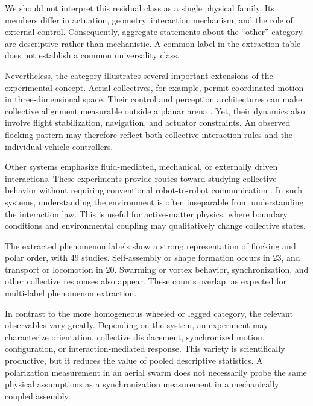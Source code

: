 We should not interpret this residual class
as a single physical family. Its members
differ in actuation, geometry, interaction
mechanism, and the role of external control.
Consequently, aggregate statements about
the ``other'' category are descriptive
rather than mechanistic. A common label
in the extraction table does not establish
a common universality class.

Nevertheless, the category illustrates
several important extensions of the
experimental concept. Aerial collectives,
for example, permit coordinated motion
in three-dimensional space. Their control
and perception architectures can make
collective alignment measurable outside
a planar arena
\cite{Hauert2011reynoldsflockingin,Vsrhelyi2014outdoorflockingand,Schilling2021visionbaseddronef,Horyna2024fastswarmingofuav,Zhang2022agileformationcont,Amorim2024aminimalistic3dse,Iacone2024decentralizedaccele}.
Yet, their dynamics also involve flight
stabilization, navigation, and actuator
constraints. An observed flocking pattern
may therefore reflect both collective
interaction rules and the individual
vehicle controllers.

Other systems emphasize fluid-mediated,
mechanical, or externally driven
interactions. These experiments provide
routes toward studying collective
behavior without requiring conventional
robot-to-robot communication
\cite{Newbolt2019flowinteractionsbe,Newbolt2024flowinteractionsle,Zhou2021synchronizedswimmin,Zhou2021collectivesynchroni,Li2024memoryinducedspont,Lin2024decodingfrequencies,Zion2024amechanicalorigin,Boudet2025effectsofboundarie}.
In such systems, understanding the
environment is often inseparable from
understanding the interaction law.
This is useful for active-matter
physics, where boundary conditions
and environmental coupling may
qualitatively change collective states.

The extracted phenomenon labels
show a strong representation of
flocking and polar order, with
49 studies. Self-assembly or shape
formation occurs in 23, and transport
or locomotion in 20. Swarming or
vortex behavior, synchronization,
and other collective responses
also appear. These counts overlap,
as expected for multi-label
phenomenon extraction.

In contrast to the more homogeneous
wheeled or legged category, the
relevant observables vary greatly.
Depending on the system, an experiment
may characterize orientation,
collective displacement, synchronized
motion, configuration, or
interaction-mediated response.
This variety is scientifically
productive, but it reduces the
value of pooled descriptive
statistics. A polarization
measurement in an aerial swarm
does not necessarily probe the
same physical assumptions as a
synchronization measurement in
a mechanically coupled assembly.

